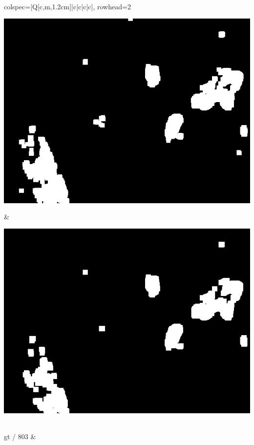 \begin{longtblr}[
            caption = {Hasil uji coba proses \textit{background subtraction} menggunakan GMM yang disempurnakan oleh Operasi Morfologi},
            label = {tab:gmm_morph_9908}
        ]{
            colspec={|Q[c,m,1.2cm]|c|c|c|c|},
            rowhead=2
        }
\begin{minipage}{0.19\textwidth}
                \includegraphics[width=\linewidth]{image/gt_124/gt_124_dilated_5x11_frame1191.jpg}
            \end{minipage} & 
            \begin{minipage}{0.19\textwidth}
                \includegraphics[width=\linewidth]{image/gt_124/gt_124_dilated_7x13_frame1191.jpg}
            \end{minipage} \\
            \hline
            gt / 803 &
            \begin{minipage}{0.19\textwidth}

\end{minipage}
\end{longtblr}
